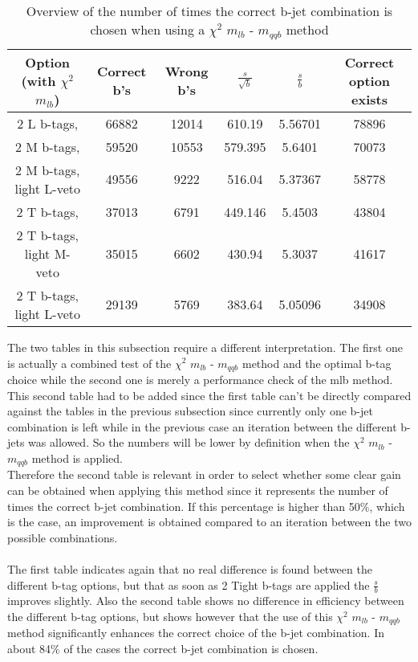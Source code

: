 \documentclass[a4paper,12pt]{report}
\begin{document}
 \begin{table}[!h] 
 \begin{tabular}{c|c|c|c|c|c} 
 \textbf{Option} (with $\chi^{2}$ $m_{lb}$) & Correct b's & Wrong b's & $\frac{s}{\sqrt{b}}$ & $\frac{s}{b}$ & Correct option exists \\ \hline 
2 L b-tags,                & 66882 & 12014 & 610.19 & 5.56701 & 78896 \\ 
2 M b-tags,              & 59520 & 10553 & 579.395 & 5.6401 & 70073 \\ 
2 M b-tags, light L-veto & 49556 & 9222 & 516.04 & 5.37367 & 58778 \\ 
2 T b-tags,              & 37013 & 6791 & 449.146 & 5.4503 & 43804 \\ 
2 T b-tags, light M-veto & 35015 & 6602 & 430.94 & 5.3037 & 41617 \\ 
2 T b-tags, light L-veto & 29139 & 5769 & 383.64 & 5.05096 & 34908 \\ 
 \end{tabular} 
 \caption{Overview of the number of times the correct b-jet combination is chosen when using a $\chi^{2}$ $m_{lb}$ - $m_{qqb}$ method} 
 \end{table}
 
The two tables in this subsection require a different interpretation. The first one is actually a combined test of the $\chi^{2}$ $m_{lb}$ - $m_{qqb}$ method and the optimal b-tag choice while the second one is merely a performance check of the mlb method. \\
This second table had to be added since the first table can't be directly compared against the tables in the previous subsection since currently only one b-jet combination is left while in the previous case an iteration between the different b-jets was allowed. So the numbers will be lower by definition when the $\chi^{2}$ $m_{lb}$ - $m_{qqb}$ method is applied.\\
Therefore the second table is relevant in order to select whether some clear gain can be obtained when applying this method since it represents the number of times the correct b-jet combination. If this percentage is higher than 50$\%$, which is the case, an improvement is obtained compared to an iteration between the two possible combinations.\\
\\
The first table indicates again that no real difference is found between the different b-tag options, but that as soon as 2 Tight b-tags are applied the $\frac{s}{b}$ improves slightly. Also the second table shows no difference in efficiency between the different b-tag options, but shows however that the use of this $\chi^{2}$ $m_{lb}$ - $m_{qqb}$ method significantly enhances the correct choice of the b-jet combination. In about 84$\%$ of the cases the correct b-jet combination is chosen. 
\end{document}
